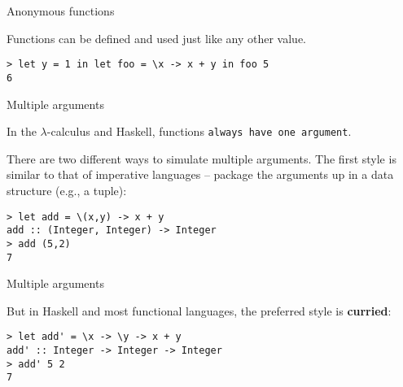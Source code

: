 %
\begin{frame}[fragile]{Anonymous functions}

Functions can be defined and used just like any other value.


\begin{block}{}
\begin{verbatim}
> let y = 1 in let foo = \x -> x + y in foo 5
6
\end{verbatim}
\end{block}

\end{frame}

%
\begin{frame}[fragile]{Multiple arguments}

In the $\lambda$-calculus and Haskell, functions \texttt{always have one
argument}.

There are two different ways to simulate multiple arguments. The first style is
similar to that of imperative languages -- package the arguments up in a data
structure (e.g., a tuple):

\begin{block}{}
\begin{verbatim}
> let add = \(x,y) -> x + y
add :: (Integer, Integer) -> Integer
> add (5,2)
7
\end{verbatim}
\end{block}

\end{frame}

%
\begin{frame}[fragile]{Multiple arguments}

But in Haskell and most functional languages, the preferred style is
\textbf{curried}:

\begin{block}{}
\begin{verbatim}
> let add' = \x -> \y -> x + y
add' :: Integer -> Integer -> Integer
> add' 5 2
7
\end{verbatim}
\end{block}

\end{frame}

